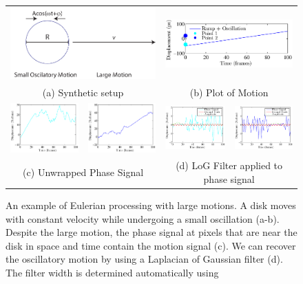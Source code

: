 \documentclass[letterpaper, 10pt]{article}
\numberwithin{equation}{section}
\begin{document}
\begin{figure}
\begin{tabular}{cccc}
\multicolumn{2}{c}{\includegraphics[width=0.49\columnwidth]{SmallOnLarge/SmallOnLarge.pdf}} & 
\multicolumn{2}{c}{\includegraphics[width=0.49\columnwidth]{SmallOnLarge/path.eps}}\\
\multicolumn{2}{c}{(a) Synthetic setup} & 
\multicolumn{2}{c}{(b) Plot of Motion} \\
\includegraphics[width=0.24\columnwidth]{SmallOnLarge/eulerPath1.eps} & 
\includegraphics[width=0.24\columnwidth]{SmallOnLarge/eulerPath2.eps} &
\includegraphics[width=0.24\columnwidth]{SmallOnLarge/eulerPathLoG1.eps} &
\includegraphics[width=0.24\columnwidth]{SmallOnLarge/eulerPathLoG2.eps}\\
\multicolumn{2}{c}{(c) Unwrapped Phase Signal} & 
\multicolumn{2}{c}{(d) LoG Filter applied to phase signal}\\
\end{tabular}
\caption{An example of Eulerian processing with large motions. A disk moves with constant velocity while undergoing a small oscillation (a-b). Despite the large motion, the phase signal at pixels that are near the disk in space and time contain the motion signal (c). We can recover the oscillatory motion by using a Laplacian of Gaussian filter (d). The filter width is determined automatically using }
\end{figure}
\end{document}
